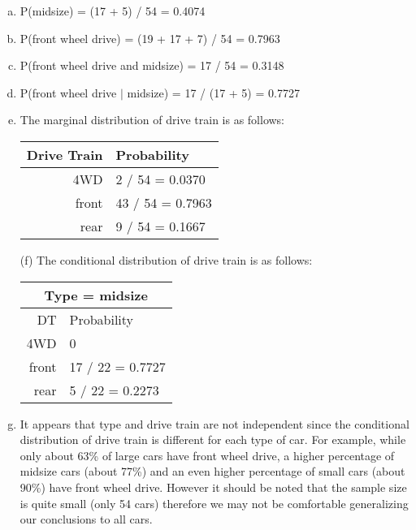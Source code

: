 {
\begin{enumerate}[(a)]
\item P(midsize) = (17 + 5) / 54 = 0.4074
\item P(front wheel drive) = (19 + 17 + 7) / 54 = 0.7963
\item P(front wheel drive and midsize) = 17 / 54 = 0.3148
\item P(front wheel drive $|$ midsize) = 17 / (17 + 5) = 0.7727
\item The marginal distribution of drive train is as follows: \\

\begin{tabular}{r | l}
Drive Train & Probability \\
\hline
4WD		& 2 / 54 = 0.0370 \\
front		& 43 / 54 = 0.7963 \\
rear		& 9 / 54 = 0.1667
\end{tabular}
\item[(f)] The conditional distribution of drive train is as follows: \\

\begin{tabular}{r | l}
\multicolumn{2}{c}{Type = midsize} \\
\hline
DT & Probability \\
\hline
4WD		& 0 \\
front		& 17 / 22 = 0.7727 \\
rear		& 5 / 22 = 0.2273
\end{tabular}

\item It appears that type and drive train are not independent since the conditional distribution of drive train is different for each type of car. For example, while only about 63\% of large cars have front wheel drive, a higher percentage of midsize cars (about 77\%) and an even higher percentage of small cars (about 90\%) have front wheel drive. However it should be noted that the sample size is quite small (only 54 cars) therefore we may not be comfortable generalizing our conclusions to all cars.
\end{enumerate}
}


